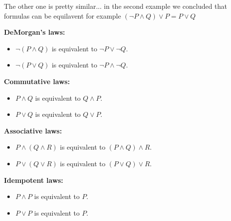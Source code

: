 \documentclass{article} %
\begin{document}
    The other one is pretty similar... in the second example we concluded that formulas can be equilavent for example $(\neg P \wedge Q) \vee P = P \vee Q$

    \newpage

    \textbf{DeMorgan’s laws:}
    \begin{itemize}[itemsep=5pt,parsep=0pt,topsep=5pt]
        \item \begin{center}$\neg(P \land Q)$ is equivalent to $\neg P \lor \neg Q$.\end{center}
        \item \begin{center}$\neg(P \lor Q)$ is equivalent to $\neg P \land \neg Q$.\end{center}
    \end{itemize}
    
    \textbf{Commutative laws:}
    \begin{itemize}[itemsep=5pt,parsep=0pt,topsep=5pt]
        \item \begin{center}$P \land Q$ is equivalent to $Q \land P$.\end{center}
        \item \begin{center}$P \lor Q$ is equivalent to $Q \lor P$.\end{center}
    \end{itemize}
    
    \textbf{Associative laws:}
    \begin{itemize}[itemsep=5pt,parsep=0pt,topsep=5pt]
        \item \begin{center}$P \land (Q \land R)$ is equivalent to $(P \land Q) \land R$.\end{center}
        \item \begin{center}$P \lor (Q \lor R)$ is equivalent to $(P \lor Q) \lor R$.\end{center}
    \end{itemize}
    
    \textbf{Idempotent laws:}
    \begin{itemize}[itemsep=5pt,parsep=0pt,topsep=5pt]
        \item \begin{center}$P \land P$ is equivalent to $P$.\end{center}
        \item \begin{center}$P \lor P$ is equivalent to $P$.\end{center}
    \end{itemize}
    
\end{document}
